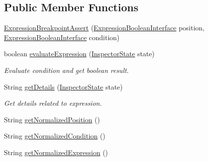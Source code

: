 \subsection*{Public Member Functions}
\begin{DoxyCompactItemize}
\item 
\hyperlink{classgov_1_1nasa_1_1jpf_1_1inspector_1_1server_1_1expression_1_1expressions_1_1_expression_breakpoint_assert_a1f248e6b2e5dcd3ffa840d825e06f48b}{Expression\+Breakpoint\+Assert} (\hyperlink{interfacegov_1_1nasa_1_1jpf_1_1inspector_1_1server_1_1expression_1_1_expression_boolean_interface}{Expression\+Boolean\+Interface} position, \hyperlink{interfacegov_1_1nasa_1_1jpf_1_1inspector_1_1server_1_1expression_1_1_expression_boolean_interface}{Expression\+Boolean\+Interface} condition)
\item 
boolean \hyperlink{classgov_1_1nasa_1_1jpf_1_1inspector_1_1server_1_1expression_1_1expressions_1_1_expression_breakpoint_assert_a402d842c7dda2630c2cd61799bb17d0c}{evaluate\+Expression} (\hyperlink{interfacegov_1_1nasa_1_1jpf_1_1inspector_1_1server_1_1expression_1_1_inspector_state}{Inspector\+State} state)
\begin{DoxyCompactList}\small\item\em Evaluate condition and get boolean result. \end{DoxyCompactList}\item 
String \hyperlink{classgov_1_1nasa_1_1jpf_1_1inspector_1_1server_1_1expression_1_1expressions_1_1_expression_breakpoint_assert_a210fc4dd15a37c0f4ecf36b19980e0a4}{get\+Details} (\hyperlink{interfacegov_1_1nasa_1_1jpf_1_1inspector_1_1server_1_1expression_1_1_inspector_state}{Inspector\+State} state)
\begin{DoxyCompactList}\small\item\em Get details related to expression. \end{DoxyCompactList}\item 
String \hyperlink{classgov_1_1nasa_1_1jpf_1_1inspector_1_1server_1_1expression_1_1expressions_1_1_expression_breakpoint_assert_a27ce20d6ff3248e2adea8a6c3b6992c4}{get\+Normalized\+Position} ()
\item 
String \hyperlink{classgov_1_1nasa_1_1jpf_1_1inspector_1_1server_1_1expression_1_1expressions_1_1_expression_breakpoint_assert_a0bf42d5c3ab24b9f0c75f59e9ad655dd}{get\+Normalized\+Condition} ()
\item 
String \hyperlink{classgov_1_1nasa_1_1jpf_1_1inspector_1_1server_1_1expression_1_1expressions_1_1_expression_breakpoint_assert_ac1924c9cf3f48ebce53169d6eb7e4267}{get\+Normalized\+Expression} ()

\end{DoxyCompactItemize}
